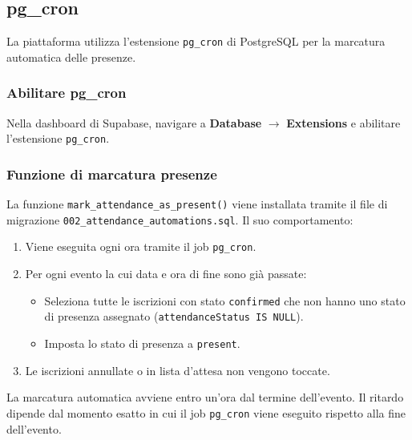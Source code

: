 \documentclass[a4paper,11pt,oneside]{book}
\begin{document}
\subsection{pg\_cron}
\label{sec:supabase-pgcron}

La piattaforma utilizza l'estensione \texttt{pg\_cron} di PostgreSQL per la marcatura automatica delle presenze.

\subsubsection{Abilitare pg\_cron}

Nella dashboard di Supabase, navigare a \textbf{Database} $\rightarrow$ \textbf{Extensions} e abilitare l'estensione \texttt{pg\_cron}.

\subsubsection{Funzione di marcatura presenze}

La funzione \texttt{mark\_attendance\_as\_present()} viene installata tramite il file di migrazione \texttt{002\_attendance\_automations.sql}. Il suo comportamento:

\begin{enumerate}[leftmargin=1.5em]
  \item Viene eseguita ogni ora tramite il job \texttt{pg\_cron}.
  \item Per ogni evento la cui data e ora di fine sono gi\`a passate:
    \begin{itemize}
      \item Seleziona tutte le iscrizioni con stato \texttt{confirmed} che non hanno uno stato di presenza assegnato (\texttt{attendanceStatus IS NULL}).
      \item Imposta lo stato di presenza a \texttt{present}.
    \end{itemize}
  \item Le iscrizioni annullate o in lista d'attesa non vengono toccate.
\end{enumerate}

\begin{infobox}
La marcatura automatica avviene entro un'ora dal termine dell'evento. Il ritardo dipende dal momento esatto in cui il job \texttt{pg\_cron} viene eseguito rispetto alla fine dell'evento.
\end{infobox}

\end{document}
